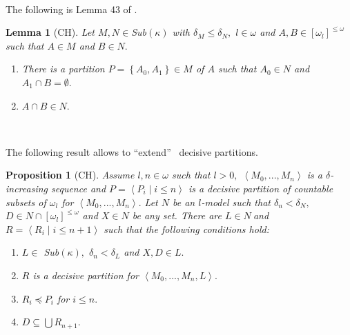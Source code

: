 \documentclass{article}%
\newtheorem{lemma}[theorem]{Lemma}
\newtheorem{proposition}[theorem]{Proposition}
\begin{document}
\qquad\qquad\qquad\ \ 

The following is Lemma 43 of \cite{UltrafiltersinRandomModel}.

\begin{lemma}
[\textsf{CH}]Let $M,N\in$\textsf{Sub}$\left(  \kappa\right)  $ with
$\delta_{M}\leq\delta_{N},$ $l\in\omega$ and $A,B\in\left[  \omega_{l}\right]
^{\leq\omega}$ such that $A\in M$ and $B\in N.$ \label{partir conjunto en dos}

\begin{enumerate}
\item There is a partition $P=\left\{  A_{0},A_{1}\right\}  \in M$ of $A$ such
that $A_{0}\in N$ and $A_{1}\cap B=\emptyset.$

\item $A\cap B\in N.$
\end{enumerate}
\end{lemma}

\qquad\ \qquad\ \ 

The following result allows to \textquotedblleft extend\textquotedblright%
\ decisive partitions.

\begin{proposition}
[\textsf{CH}]Assume $l,n\in\omega$ such that $l>0,$ $\left\langle
M_{0},...,M_{n}\right\rangle $ is a $\delta$-increasing sequence and
$P=\left\langle P_{i}\mid i\leq n\right\rangle $ is a decisive partition of
countable subsets of $\omega_{l}$ for $\left\langle M_{0},...,M_{n}%
\right\rangle .$ Let $N$ be an $l$-model such that $\delta_{n}<\delta_{N},$
$D\in N\cap\left[  \omega_{l}\right]  ^{\leq\omega}$ and $X\in N$ be any set.
There are $L\in N\ $and $R=\left\langle R_{i}\mid i\leq n+1\right\rangle $
such that the following conditions hold: \label{Agrandar Particion}

\begin{enumerate}
\item $L\in$ \textsf{Sub}$\left(  \kappa\right)  ,$ $\delta_{n}<\delta_{L}$
and $X,D\in L.$

\item $R$ is a decisive partition for $\left\langle M_{0},...,M_{n}%
,L\right\rangle .$

\item $R_{i}\preceq P_{i}$ for $i\leq n.$

\item $D\subseteq\bigcup R_{n+1}.$\qquad\qquad\qquad\ \ \ \ \ \ \ \ \ \ 
\end{enumerate}
\end{proposition}
\end{document}
